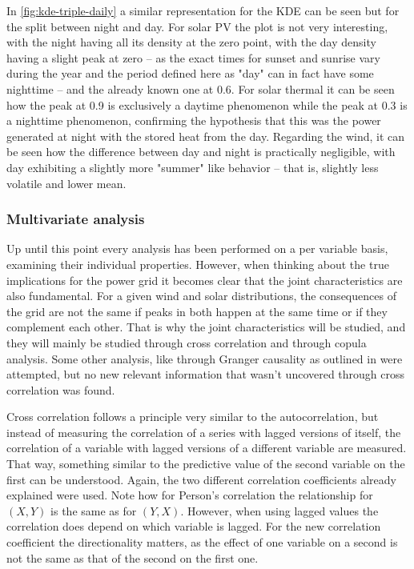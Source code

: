 In \autoref{fig:kde-triple-daily} a similar representation for the KDE can be seen but for the split between night and day. For solar PV the plot is not very interesting, with the night having all its density at the zero point, with the day density having a slight peak at zero -- as the exact times for sunset and sunrise vary during the year and the period defined here as "day" can in fact have some nighttime -- and the already known one at 0.6. For solar thermal it can be seen how the peak at 0.9 is exclusively a daytime phenomenon while the peak at 0.3 is a nighttime phenomenon, confirming the hypothesis that this was the power generated at night with the stored heat from the day. Regarding the wind, it can be seen how the difference between day and night is practically negligible, with day exhibiting a slightly more "summer" like behavior -- that is, slightly less volatile and lower mean. 

\subsubsection{Multivariate analysis}
\label{sec:multivariate-analysis}
Up until this point every analysis has been performed on a per variable basis, examining their individual properties. However, when thinking about the true implications for the power grid it becomes clear that the joint characteristics are also fundamental. For a given wind and solar distributions, the consequences of the grid are not the same if peaks in both happen at the same time or if they complement each other. That is why the joint characteristics will be studied, and they will mainly be studied through cross correlation and through copula analysis. Some other analysis, like through Granger causality as outlined in \cite{granger_1969} were attempted, but no new relevant information that wasn't uncovered through cross correlation was found. 

Cross correlation follows a principle very similar to the autocorrelation, but instead of measuring the correlation of a series with lagged versions of itself, the correlation of a variable with lagged versions of a different variable are measured. That way, something similar to the predictive value of the second variable on the first can be understood. Again, the two different correlation coefficients already explained were used. Note how for Person's correlation the relationship for $\left(X,Y\right)$ is the same as for $\left(Y,X\right)$. However, when using lagged values the correlation does depend on which variable is lagged. For the new correlation coefficient the directionality matters, as the effect of one variable on a second is not the same as that of the second on the first one. 

